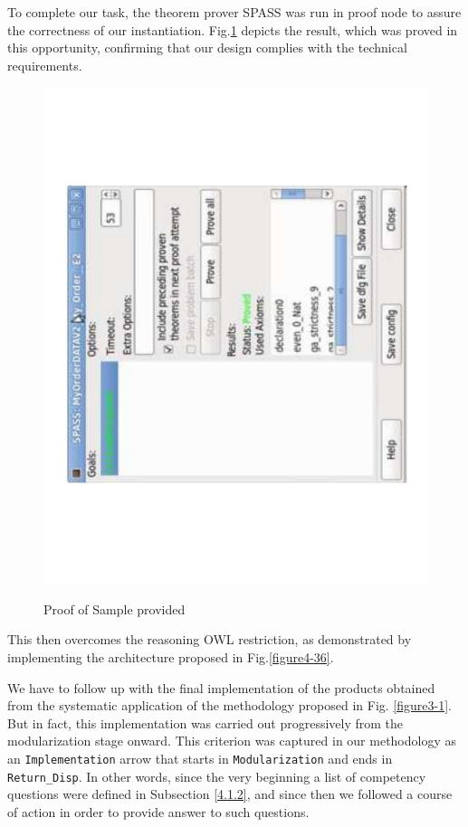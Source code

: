 To complete our task, the theorem prover SPASS \citep{weidenbach_chapter_2001} was run in proof node to assure the correctness of our instantiation. Fig.\ref{figure4-40} depicts the result, which was proved in this opportunity, confirming that our design complies with the technical requirements.



\begin{figure}
\begin{center}
	\includegraphics[scale=0.5, angle=-90]{figure-chapterIV/fig4-40.pdf}\\
	\caption{Proof of Sample provided}
	\label{figure4-40}
\end{center}
\end{figure}

This then overcomes the reasoning OWL restriction, as demonstrated by implementing the architecture proposed in Fig.\ref{figure4-36}.

We have to follow up with the final implementation of the products obtained from the systematic application of the methodology proposed in Fig. \ref{figure3-1}. But in fact, this implementation was carried out progressively from the modularization stage onward. This criterion was captured in our methodology as an \texttt{Implementation} arrow that starts in \texttt{Modularization} and ends in \texttt{Return\_Disp}. \cbstart In other words, since the very beginning a list of competency questions were defined in Subsection \ref{4.1.2}, and since then we followed a course of action in order to provide answer to such questions.\cbend 


